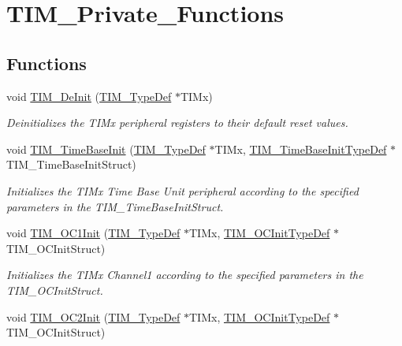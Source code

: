 \hypertarget{group___t_i_m___private___functions}{}\section{T\+I\+M\+\_\+\+Private\+\_\+\+Functions}
\label{group___t_i_m___private___functions}
\subsection*{Functions}
\begin{DoxyCompactItemize}
\item 
void \mbox{\hyperlink{group___t_i_m___private___functions_ga1659cc0ce503ac151568e0c7c02b1ba5}{T\+I\+M\+\_\+\+De\+Init}} (\mbox{\hyperlink{struct_t_i_m___type_def}{T\+I\+M\+\_\+\+Type\+Def}} $\ast$T\+I\+Mx)
\begin{DoxyCompactList}\small\item\em Deinitializes the T\+I\+Mx peripheral registers to their default reset values. \end{DoxyCompactList}\item 
void \mbox{\hyperlink{group___t_i_m___private___functions_ga83fd58c9416802d9638bbe1715c98932}{T\+I\+M\+\_\+\+Time\+Base\+Init}} (\mbox{\hyperlink{struct_t_i_m___type_def}{T\+I\+M\+\_\+\+Type\+Def}} $\ast$T\+I\+Mx, \mbox{\hyperlink{struct_t_i_m___time_base_init_type_def}{T\+I\+M\+\_\+\+Time\+Base\+Init\+Type\+Def}} $\ast$T\+I\+M\+\_\+\+Time\+Base\+Init\+Struct)
\begin{DoxyCompactList}\small\item\em Initializes the T\+I\+Mx Time Base Unit peripheral according to the specified parameters in the T\+I\+M\+\_\+\+Time\+Base\+Init\+Struct. \end{DoxyCompactList}\item 
void \mbox{\hyperlink{group___t_i_m___private___functions_gafcdb6ff00158862aef7fed5e7a554a3e}{T\+I\+M\+\_\+\+O\+C1\+Init}} (\mbox{\hyperlink{struct_t_i_m___type_def}{T\+I\+M\+\_\+\+Type\+Def}} $\ast$T\+I\+Mx, \mbox{\hyperlink{struct_t_i_m___o_c_init_type_def}{T\+I\+M\+\_\+\+O\+C\+Init\+Type\+Def}} $\ast$T\+I\+M\+\_\+\+O\+C\+Init\+Struct)
\begin{DoxyCompactList}\small\item\em Initializes the T\+I\+Mx Channel1 according to the specified parameters in the T\+I\+M\+\_\+\+O\+C\+Init\+Struct. \end{DoxyCompactList}\item 
void \mbox{\hyperlink{group___t_i_m___private___functions_ga2017455121d910d6ff63ac6f219842c5}{T\+I\+M\+\_\+\+O\+C2\+Init}} (\mbox{\hyperlink{struct_t_i_m___type_def}{T\+I\+M\+\_\+\+Type\+Def}} $\ast$T\+I\+Mx, \mbox{\hyperlink{struct_t_i_m___o_c_init_type_def}{T\+I\+M\+\_\+\+O\+C\+Init\+Type\+Def}} $\ast$T\+I\+M\+\_\+\+O\+C\+Init\+Struct)

\end{DoxyCompactItemize}
